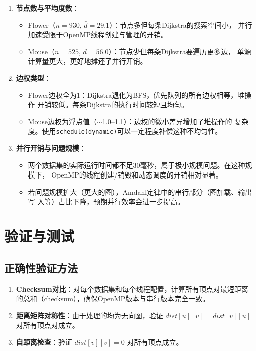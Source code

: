 \documentclass[UTF8,a4paper,12pt,fontset=none]{ctexart}
\begin{document}
\begin{enumerate}[leftmargin=2.2em]
  \item \textbf{节点数与平均度数}：
        \begin{itemize}
          \item Flower（$n=930$, $\bar{d}=29.1$）：节点多但每条Dijkstra的搜索空间小，
                并行加速受限于OpenMP线程创建与管理的开销。
          \item Mouse（$n=525$, $\bar{d}=56.0$）：节点少但每条Dijkstra要遍历更多边，
                单源计算量更大，更好地摊还了并行开销。
        \end{itemize}

  \item \textbf{边权类型}：
        \begin{itemize}
          \item Flower边权全为1：Dijkstra退化为BFS，优先队列的所有边权相等，堆操作
                开销较低。每条Dijkstra的执行时间较短且均匀。
          \item Mouse边权为浮点值（$\sim$1.0--1.1）：边权的微小差异增加了堆操作的
                复杂度。使用\texttt{schedule(dynamic)}可以一定程度补偿这种不均匀性。
        \end{itemize}

  \item \textbf{并行开销与问题规模}：
        \begin{itemize}
          \item 两个数据集的实际运行时间都不足30毫秒，属于极小规模问题。在这种规模下，
                OpenMP的线程创建/销毁和动态调度的开销相对显著。
          \item 若问题规模扩大（更大的图），Amdahl定律中的串行部分（图加载、输出写
                入等）占比下降，预期并行效率会进一步提高。
        \end{itemize}
\end{enumerate}

\section{验证与测试}

\subsection{正确性验证方法}

\begin{enumerate}[leftmargin=2.2em]
  \item \textbf{Checksum对比}：对每个数据集和每个线程配置，计算所有顶点对最短距离
        的总和（checksum），确保OpenMP版本与串行版本完全一致。
  \item \textbf{距离矩阵对称性}：由于处理的均为无向图，验证 $\mathit{dist}[u][v] =
        \mathit{dist}[v][u]$ 对所有顶点对成立。
  \item \textbf{自距离检查}：验证 $\mathit{dist}[v][v] = 0$ 对所有顶点成立。
\end{enumerate}
\end{document}
